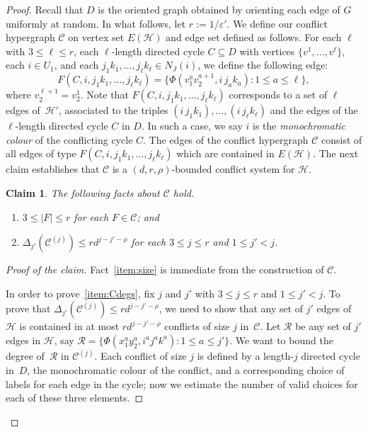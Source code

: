 \documentclass[a4paper, 11pt,reqno]{amsart}
\newcommand{\calC}{\mathcal{C}}
\newcommand{\calH}{\mathcal{H}}
\newcommand{\calR}{\mathcal{R}}
\theoremstyle{plain}
\newtheorem{claim}[theorem]{Claim}
\theoremstyle{definition}
\numberwithin{equation}{section}
\newcommand{\eps}{\varepsilon}
\newenvironment{proofclaim}[1][Proof of the claim]{\begin{proof}[#1]\renewcommand*{\qedsymbol}{\(\square\)}}{\end{proof}}
\renewcommand*{\qedsymbol}{\(\blacksquare\)}
\begin{document}
\begin{proof}
Recall that $D$ is the oriented graph obtained by orienting each
edge of $G$ uniformly at random. In what follows, let
\(
r:= 1/\eps'.
\)
We define our conflict hypergraph $\mathcal{C}$ on vertex set $E(\mathcal{H})$ 
and edge set defined as follows. For each $\ell$ with $3 \leq \ell \leq r$, 
each $\ell$-length directed cycle $C \subseteq D$ with vertices 
$\{v^1, \dotsc, v^\ell\}$, each $i \in U_1$, and each $j_1 k_1, \dotsc, j_\ell k_\ell \in N_J(i)$, 
we define the following edge:
\[
F(C,i,j_1k_1,\dotsc,j_\ell k_\ell) = \{\Phi(v^{a}_1 v^{a+1}_2, i\,j_a k_a) : 1 \leq a \leq \ell\},
\]
where $v^{\ell+1}_2 = v^1_2$. 
Note that $F(C, i, j_1 k_1, \dotsc, j_\ell k_\ell)$ corresponds to a set of $\ell$ edges of~$\calH'$,
associated to the triples $(i\,j_1 k_1), \dotsc, (i\,j_\ell k_\ell)$ 
and the edges of the $\ell$-length directed cycle $C$ in $D$. 
In such a case, we say $i$ is the \emph{monochromatic colour} of the conflicting cycle $C$. 
The edges of the conflict hypergraph $\mathcal{C}$ consist
of all edges of type $F(C, i, j_1 k_1, \dotsc, j_\ell k_\ell)$ which are contained in $E(\mathcal{H})$. 
The next claim establishes 
that $\calC$ is a $(d, r, \rho)$-bounded conflict system for $\calH$. 

\begin{claim} \label{claim:hypothesesC}
	The following facts about $\calC$ hold.
	\begin{enumerate}[\upshape{\textbf{(C\arabic*)}},labelindent=0pt,labelwidth=\widthof{\ref{item:Cdegs}},leftmargin=!]
		\item \label{item:size} $3 \leq |F| \leq r$ for each $F \in \mathcal{C}$; and
		\item \label{item:Cdegs} $\Delta_{j'}(\mathcal{C}^{(j)}) \leq r d^{j - j' - \rho}$ for each $3 \leq j \leq r$ and $1 \leq j' < j$. 
	\end{enumerate}
\end{claim}

\begin{proofclaim}
	Fact~\ref{item:size} is immediate from the construction of $\calC$. 
	
	In order to prove~\ref{item:Cdegs}, 
	fix $j$ and $j'$ with $3 \leq j \leq r$ and $1 \leq j' < j$.  
	To prove that $\Delta_{j'}(\calC^{(j)}) \leq r d^{j - j' - \rho}$, 
	we need to show that any set of $j'$ edges of~$\calH$ is contained 
	in at most $r d^{j - j' - \rho}$ conflicts of size $j$ in~$\calC$. 
	Let $\calR$ be any set of $j'$ edges in $\calH$, 
	say $\calR = \{ \Phi( x_1^a y_2^a, i^a j^a k^a ) : 1 \leq a \leq j' \}$.  
	We want to bound the degree of~$\calR$ in $\calC^{(j)}$. 
	Each conflict of size $j$ is defined by a length-$j$ directed cycle 
	in~$D$, the monochromatic colour of the conflict, and a corresponding choice of labels for each edge in the cycle;
	now we estimate the number of valid choices for each of these three elements.
	

\end{proofclaim}
\end{proof}
\end{document}
